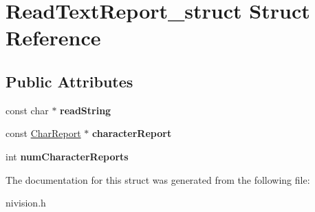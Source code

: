\hypertarget{structReadTextReport__struct}{\section{\-Read\-Text\-Report\-\_\-struct \-Struct \-Reference}
\label{structReadTextReport__struct}
}
\subsection*{\-Public \-Attributes}
\begin{DoxyCompactItemize}
\item 
\hypertarget{structReadTextReport__struct_a1744b020cdbfb6f0fe227ad620280231}{const char $\ast$ {\bfseries read\-String}}\label{structReadTextReport__struct_a1744b020cdbfb6f0fe227ad620280231}

\item 
\hypertarget{structReadTextReport__struct_ae5066351fe209d05de3393ca3e462b8f}{const \hyperlink{structCharReport__struct}{\-Char\-Report} $\ast$ {\bfseries character\-Report}}\label{structReadTextReport__struct_ae5066351fe209d05de3393ca3e462b8f}

\item 
\hypertarget{structReadTextReport__struct_aa7dde1044c8d800f7628c8e5ade9c44c}{int {\bfseries num\-Character\-Reports}}\label{structReadTextReport__struct_aa7dde1044c8d800f7628c8e5ade9c44c}

\end{DoxyCompactItemize}


\-The documentation for this struct was generated from the following file\-:\begin{DoxyCompactItemize}
\item 
nivision.\-h\end{DoxyCompactItemize}
